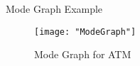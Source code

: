 \documentclass[10pt]{beamer}
\theoremstyle{plain}
\theoremstyle{definition}
\begin{document}
\begin{frame}{Mode Graph Example}
%			
	\begin{figure}[htp]
		\centering
		\texttt{[image: "ModeGraph"]}
		\caption{Mode Graph for ATM}
		\label{fig:Mode Graph for ATM}
	\end{figure}
\end{frame}
\end{document}
